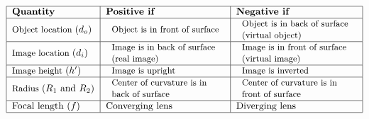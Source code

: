 \documentclass{article}
\begin{document}
\[
\begin{tabular}{|l|l|l|}
\hline
\textbf{Quantity} & \textbf{Positive if} & \textbf{Negative if} \\ \hline
{\small Object location }$\left( d_{o}\right) $ & 
\begin{tabular}{l}
{\small Object is in front of surface} \\ 
\end{tabular}
& 
\begin{tabular}{l}
{\small Object is in back of surface} \\ 
{\small (virtual object)}%
\end{tabular}%
{\small \ } \\ \hline
{\small Image location }$\left( d_{i}\right) $ & 
\begin{tabular}{l}
{\small Image is in back of surface} \\ 
{\small (real image)}%
\end{tabular}
& 
\begin{tabular}{l}
{\small Image is in front of surface } \\ 
{\small (virtual image)}%
\end{tabular}
\\ \hline
{\small Image height }$\left( h^{\prime }\right) $ & 
\begin{tabular}{l}
{\small Image is upright}%
\end{tabular}
& 
\begin{tabular}{l}
{\small Image is inverted}%
\end{tabular}
\\ \hline
{\small Radius }$\left( R_{1}\text{ and }R_{2}\right) $ & 
\begin{tabular}{l}
{\small Center of curvature is in} \\ 
{\small back of surface}%
\end{tabular}%
{\small \ } & 
\begin{tabular}{l}
{\small Center of curvature is in} \\ 
{\small front of surface}%
\end{tabular}%
{\small \ } \\ \hline
Focal length $\left( f\right) $ & Converging lens & Diverging lens \\ \hline
\end{tabular}%
\]
\end{document}
